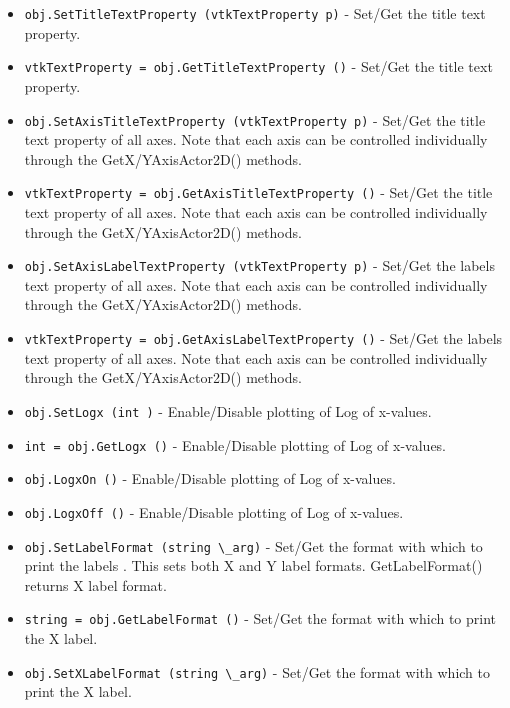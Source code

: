 \begin{itemize}
\item  \verb|obj.SetTitleTextProperty (vtkTextProperty p)| -  Set/Get the title text property.

\item  \verb|vtkTextProperty = obj.GetTitleTextProperty ()| -  Set/Get the title text property.

\item  \verb|obj.SetAxisTitleTextProperty (vtkTextProperty p)| -  Set/Get the title text property of all axes. Note that each axis can
 be controlled individually through the GetX/YAxisActor2D() methods.

\item  \verb|vtkTextProperty = obj.GetAxisTitleTextProperty ()| -  Set/Get the title text property of all axes. Note that each axis can
 be controlled individually through the GetX/YAxisActor2D() methods.

\item  \verb|obj.SetAxisLabelTextProperty (vtkTextProperty p)| -  Set/Get the labels text property of all axes. Note that each axis can
 be controlled individually through the GetX/YAxisActor2D() methods.

\item  \verb|vtkTextProperty = obj.GetAxisLabelTextProperty ()| -  Set/Get the labels text property of all axes. Note that each axis can
 be controlled individually through the GetX/YAxisActor2D() methods.

\item  \verb|obj.SetLogx (int )| -  Enable/Disable plotting of Log of x-values.

\item  \verb|int = obj.GetLogx ()| -  Enable/Disable plotting of Log of x-values.

\item  \verb|obj.LogxOn ()| -  Enable/Disable plotting of Log of x-values.

\item  \verb|obj.LogxOff ()| -  Enable/Disable plotting of Log of x-values.

\item  \verb|obj.SetLabelFormat (string \_arg)| -  Set/Get the format with which to print the labels . This sets both X
 and Y label formats. GetLabelFormat() returns X label format.

\item  \verb|string = obj.GetLabelFormat ()| -  Set/Get the format with which to print the X label.

\item  \verb|obj.SetXLabelFormat (string \_arg)| -  Set/Get the format with which to print the X label.


\end{itemize}
